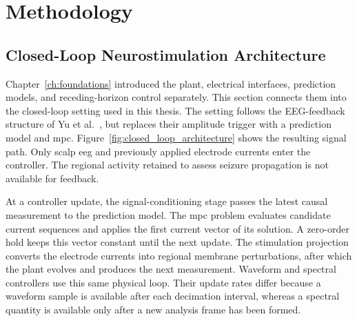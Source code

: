 \chapter{Methodology}
\label{ch:methodology}


\section{Closed-Loop Neurostimulation Architecture}

Chapter~\ref{ch:foundations} introduced the plant, electrical interfaces, prediction
models, and receding-horizon control separately. This section connects them into the
closed-loop setting used in this thesis. The setting follows the EEG-feedback structure
of Yu et al.~\cite{Yu2024}, but replaces their amplitude trigger with a prediction model %
and \ac{mpc}. Figure~\ref{fig:closed_loop_architecture} shows the resulting signal path.
Only scalp \ac{eeg} and previously applied electrode currents enter the controller.
The regional activity retained to assess seizure propagation is not available for feedback.

At a controller update, the signal-conditioning stage passes the latest causal %
measurement to the prediction model. The \ac{mpc} problem evaluates candidate current
sequences and applies the first current vector of its solution. A zero-order hold keeps
this vector constant until the next update. The stimulation projection converts the
electrode currents into regional membrane perturbations, after which the plant evolves
and produces the next measurement. Waveform and spectral controllers use this same
physical loop. Their update rates differ because a waveform sample is available after
each decimation interval, whereas a spectral quantity is available only after a new
analysis frame has been formed.

